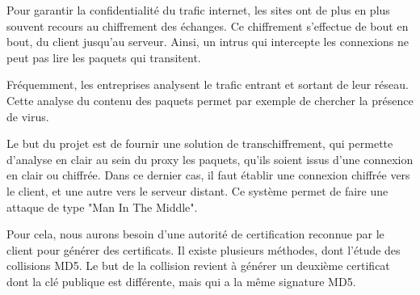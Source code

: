 Pour garantir la confidentialité du trafic internet, les sites ont de plus en plus souvent recours au chiffrement des échanges. Ce chiffrement s'effectue de bout en bout, du client jusqu'au serveur.
Ainsi, un intrus qui intercepte les connexions ne peut pas lire les paquets qui transitent.


Fréquemment, les entreprises analysent le trafic entrant et sortant de leur réseau. Cette analyse du contenu des paquets permet par exemple de chercher la présence de virus.


Le but du projet est de fournir une solution de transchiffrement, qui permette d'analyse en clair au sein du proxy les paquets, qu'ils soient issus d'une connexion en clair ou chiffrée. Dans ce dernier cas, il faut établir une connexion chiffrée vers le client, et une autre vers le serveur distant. Ce système permet de faire une attaque de type "Man In The Middle".


Pour cela, nous aurons besoin d'une autorité de certification reconnue par le client pour générer des certificats.
Il existe plusieurs méthodes, dont l'étude des collisions MD5.
Le but de la collision revient à générer un deuxième certificat dont la clé publique est différente, mais qui a la même signature MD5.
